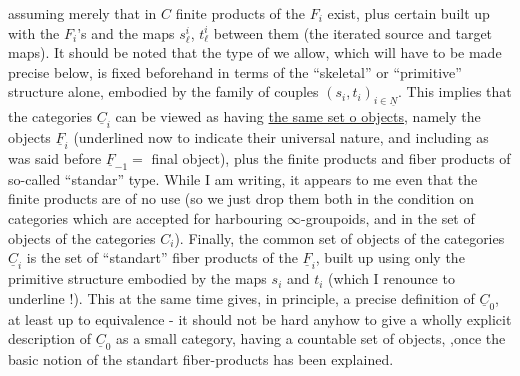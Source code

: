 assuming merely that in $C$  finite products of the $F_i$ exist, plus certain  built up with the $F_i$'s and the maps $s^i_\ell$, $t^i_\ell$ between them (the iterated source and target maps). It should be noted that the type of \inserted{\handwritten{$\varprojlim$}} we allow, which will have to be made precise below, is fixed beforehand in terms of the ``skeletal'' or ``primitive'' structure alone, embodied by the family of couples $(s_i,t_i)_{i\in\underline{N}}$. This implies that the  categories $\underline{C}_i$ can be viewed as having \uline{the same set o objects}, namely the objects $\underline{F}_i$ (underlined now to indicate their universal nature, and including as was said before $\underline{F}_{-1}=$ final object), plus the finite products and  fiber products of  so-called ``standar'' type. While I am writing, it appears to me  even that the finite products  are of no use (so we just drop them both in the condition on categories which are accepted for harbouring $\infty$-groupoids, and in the set of objects of the categories $C_i$). Finally, the common set of objects of the categories $\underline{C}_i$ is the set of ``standart''  fiber products of the $\underline{F}_i$, built up using only the primitive structure embodied by the maps $s_i$ and $t_i$ (which I renounce to underline !). This at the same time gives, in principle, a precise definition of $\underline{C}_0$, at least up to equivalence - it should not be hard anyhow to give a wholly explicit description of $\underline{C}_0$ as a small category, having a countable set of objects, ,once the basic notion of the standart  fiber-products has been explained.


